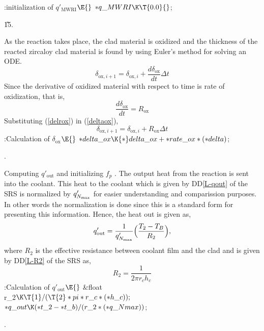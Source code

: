 \documentclass[letterpaper,12pt,baseclass=report]{cweb-hy}
\begin{document}
{
\Y\B\4:initialization of $q'_{\mathrm{MWRI}}$\X${}\E{}$\6
${*}\\{q\_MWRI}\K\T{0.0}{}$;\par
\U15.\fi

As the reaction takes place, the clad material is oxidized and
the thickness of the reacted zircaloy clad material is found by using Euler's
method
for solving an ODE.
\begin{equation}
\delta_{\text{ox},i+1}=\delta_{\text{ox},i}+\frac{d\delta_{\text{ox}}}{dt}%
\Delta t \label{deltaox}
\end{equation}
Since the derivative of oxidized material with respect to time is rate of
oxidization,
that is,
\begin{equation}
\frac{d\delta_{\text{ox}}}{dt}=R_{\text{ox}} \label{delrox}
\end{equation}
Substituting (\ref{delrox}) in (\ref{deltaox}),
\begin{equation}
\delta_{\text{ox},i+1}=\delta_{\text{ox},i}+R_{\text{ox}}\Delta t %
\label{delta_ox}
\end{equation}
\Y\B\4:Calculation of $\delta_{\text{ox}}$\X${}\E{}$\6
${*}\\{delta\_ox}\K{*}\\{delta\_ox}+{*}\\{rate\_ox}*({*}\\{delta}){}$;\par
{}.\fi

\fi

Computing $q'_{\text{out}}$ and initializing $f_{p}$ .\label{qoutfp}
The output heat from the reaction is sent into the coolant. This heat to the
coolant
which is given by DD\ref{L-qout} of the SRS is normalized by $q'_{N_{%
\text{max}}}$ for
easier understanding and comparission purposes. In other words the
normalization
is done since this is a standard form for presenting this information. Hence,
the
heat out is given as,
\begin{equation}
q'_{\text{out}}=\frac{1}{q'_{N_{\text{max}}}}\Bigl(\frac{T_2-T_B}{R_2}\Bigr),
\end{equation}
where $R_2$ is the effective resistance between coolant film and the clad
and is given by DD\ref{L-R2} of the SRS as,
\begin{equation}
R_2=\frac{1}{2\pi r_c h_c}
\end{equation}
\Y\B\4:Calculation of $q'_{\text{out}}$\X${}\E{}$\6
\&{float} \\{r\_2}${}\K\T{1}/(\T{2}*\\{pi}*\\{r\_c}*({*}\\{h\_c}));{}$\7
${}{*}\\{q\_out}\K({*}\\{t\_2}-{*}\\{t\_b})/(\\{r\_2}*({*}\\{q\_Nmax})){}$;\par
{}.\fi

}
\end{document}

